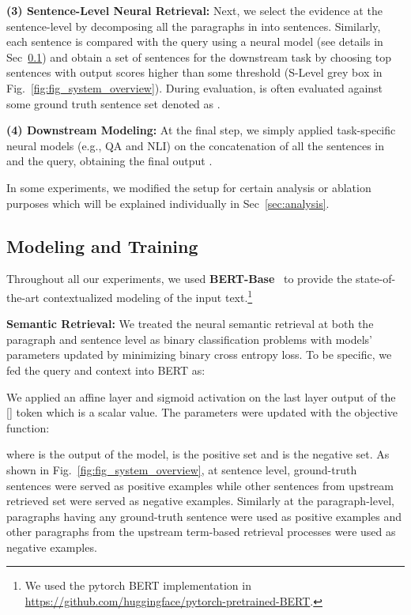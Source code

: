 \documentclass[11pt,a4paper]{article}
\begin{document}
\noindent\textbf{(3) Sentence-Level Neural Retrieval:} Next, we select the evidence at the sentence-level by decomposing all the paragraphs in  into sentences. Similarly, each sentence is compared with the query using a neural model (see details in Sec~\ref{sec:model_train}) and obtain a set of sentences  for the downstream task by choosing top  sentences with output scores higher than some threshold  (S-Level grey box in Fig.~\ref{fig:fig_system_overview}). During evaluation,  is often evaluated against some ground truth sentence set denoted as .

\noindent\textbf{(4) Downstream Modeling:}
At the final step, we simply applied task-specific neural models (e.g., QA and NLI) on the concatenation of all the sentences in  and the query, obtaining the final output .

In some experiments, we modified the setup for certain analysis or ablation purposes which will be explained individually in Sec~\ref{sec:analysis}.

\subsection{Modeling and Training}
\label{sec:model_train}
Throughout all our experiments, we used \textbf{BERT-Base}~\cite{devlin2018bert} to provide the state-of-the-art contextualized modeling of the input text.\footnote{We used the pytorch BERT implementation in \url{https://github.com/huggingface/pytorch-pretrained-BERT}.}

\vspace{5pt}\textbf{Semantic Retrieval:} We treated the neural semantic retrieval at both the paragraph and sentence level as binary classification problems with models' parameters updated by minimizing binary cross entropy loss. To be specific, we fed the query and context into BERT as:

We applied an affine layer and sigmoid activation on the last layer output of the [] token which is a scalar value. The parameters were updated with the objective function:

where  is the output of the model,  is the positive set and  is the negative set. As shown in Fig.~\ref{fig:fig_system_overview}, at sentence level, ground-truth sentences were served as positive examples while other sentences from upstream retrieved set were served as negative examples. Similarly at the paragraph-level, paragraphs having any ground-truth sentence were used as positive examples and other paragraphs from the upstream term-based retrieval processes were used as negative examples.
\end{document}
